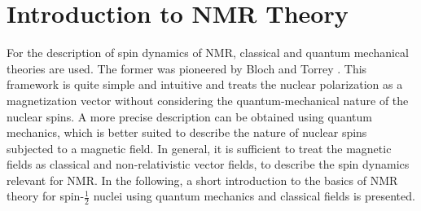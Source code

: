 
\chapter{Introduction to NMR Theory}
\label{chapter:intro}
\vspace{1cm}
For the description of spin dynamics of NMR, classical and quantum mechanical theories are used.
The former was pioneered by Bloch and Torrey \cite{Bloch1946, Torrey1956}. This framework is quite simple and intuitive and treats the nuclear polarization as a magnetization vector without considering the quantum-mechanical nature of the nuclear spins.
A more precise description can be obtained using
quantum mechanics, which is better suited to describe the nature of nuclear spins subjected to a magnetic field.
In general, it is sufficient to treat the magnetic fields as classical and non-relativistic
vector fields, to describe the spin dynamics relevant for NMR. In the following, a short introduction to the basics of NMR theory for spin-$\frac{1}{2}$ nuclei using quantum mechanics and classical fields is presented.

